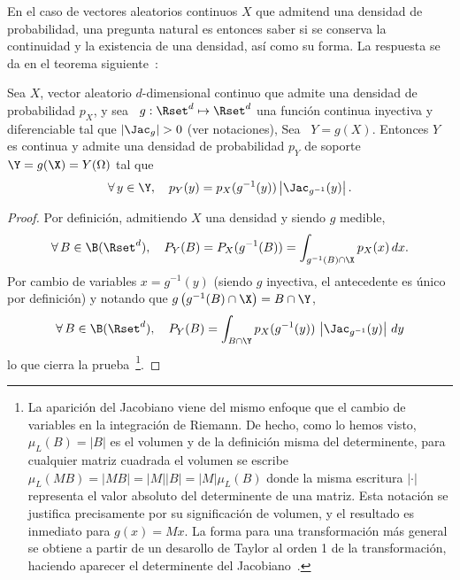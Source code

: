 En el  caso de vectores  aleatorios continuos $X$  que admitend una  densidad de
probabilidad,  una  pregunta  natural  es  entonces  saber  si  se  conserva  la
continuidad y la  existencia de una densidad, as\'i como  su forma. La respuesta
se da en el teorema siguiente~\cite{Bre88, JacPro03, AthLah06, Coh13, HogMck13}:
%
\begin{teorema}\label{Teo:MP:TransformacionInyectivaDensidad}
%
  Sea $X$, vector aleatorio $d$-dimensional  continuo que admite una densidad de
  probabilidad $p_X$, y sea \ $g:\Rset^d \mapsto \Rset^d$ una funci\'on continua
  inyectiva y diferenciable tal que
  $\left| \Jac_g \right| > 0$ (ver notaciones),
  Sea  \  $Y =  g(X)$.   Entonces  $Y$ es  continua  y  admite  una densidad  de
  probabilidad $p_Y$ de soporte $\Y = g(\X) = Y(\Omega)$ tal que
  \[
  \forall \,  y \in  \Y, \quad p_Y(y)  = p_X(g^{-1}(y))  \left| \Jac_{g^{-1}}(y)
  \right|.
  \]
\end{teorema}
%
\begin{proof}
  Por definici\'on, admitiendo $X$ una densidad y  siendo $g$ medible,
  \[
  \forall \, B \in \B(\Rset^d),  \quad P_Y(B) = P_X(g^{-1}(B)) = \int_{g^{-1}(B)
    \cap \X} p_X(x) \, dx.
  \]
  Por cambio de variables $x  = g^{-1}(y)$ (siendo $g$ inyectiva, el antecedente
  es \'unico por definici\'on) y  notando que $g\left( g^{-1}(B) \cap \X \right)
  = B \cap \Y$,
  \[
  \forall \, B  \in \B(\Rset^d), \quad P_Y(B) =  \int_{B \cap \Y} p_X(g^{-1}(y))
  \, \left| \Jac_{g^{-1}}(y) \right| \, dy
  \]
  lo que cierra la prueba~\footnote{La aparici\'on del Jacobiano viene del mismo
    enfoque que el cambio de variables en la integraci\'on de Riemann. De hecho,
    como lo  hemos visto, $\mu_L(B)  = |B|$ es  el volumen y de  la definici\'on
    misma del determinente, para cualquier matriz cuadrada el volumen se escribe
    \ $\mu_L(M  B) = |M B|  = |M| |B| =  |M| \mu_L(B)$ donde  la misma escritura
    $|\cdot|$ representa el valor absoluto  del determinente de una matriz. Esta
    notaci\'on se justifica precisamente por su significaci\'on de volumen, y el
    resultado   es  inmediato  para   $g(x)  =   M  x$.    La  forma   para  una
    transformaci\'on m\'as general se obtiene a partir de un desarollo de Taylor
    al orden  1 de  la transformaci\'on, haciendo  aparecer el  determinente del
    Jacobiano~\cite{AthLah06, Coh13}.}.
\end{proof}

